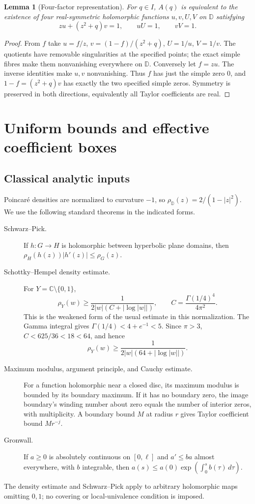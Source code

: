\documentclass[11pt,a4paper]{article}
\newtheorem{lemma}[theorem]{Lemma}
\theoremstyle{definition}\newtheorem{definition}[theorem]{Definition}
\theoremstyle{remark}\newtheorem{remark}[theorem]{Remark}
\newcommand{\D}{\mathbb D}\newcommand{\R}{\mathbb R}
\newcommand{\C}{\mathbb C}\newcommand{\Qrat}{\mathbb Q}
\begin{document}
\begin{lemma}[Four-factor representation]\label{lem:factors}
For $q\in I$, $A(q)$ is equivalent to the existence of four
real-symmetric holomorphic functions $u,v,U,V$ on $\D$ satisfying
\begin{equation}\label{eq:factors}
 zu+(z^2+q)v=1,\qquad uU=1,\qquad vV=1.
\end{equation}
\end{lemma}
\begin{proof}
From $f$ take $u=f/z$, $v=(1-f)/(z^2+q)$, $U=1/u$, $V=1/v$.
The quotients have removable singularities at the specified points;
the exact simple fibres make them nonvanishing everywhere on $\D$.
Conversely let $f=zu$. The inverse identities make $u,v$ nonvanishing.
Thus $f$ has just the simple zero $0$, and
$1-f=(z^2+q)v$ has exactly the two specified simple zeros. Symmetry is
preserved in both directions, equivalently all Taylor coefficients are real.
\end{proof}

\section{Uniform bounds and effective coefficient boxes}\label{sec:bounds}
\subsection{Classical analytic inputs}
Poincar\'e densities are normalized to curvature $-1$, so
$\rho_\D(z)=2/(1-|z|^2)$. We use the following standard theorems in
the indicated forms.
\begin{description}
\item[Schwarz--Pick.]
If $h:G\to H$ is holomorphic between hyperbolic plane domains, then
$\rho_H(h(z))|h'(z)|\leq\rho_G(z)$.
\item[Schottky--Hempel density estimate.]
For $Y=\C\setminus\{0,1\}$,
\[
 \rho_Y(w)\geq\frac1{2|w|(C+|\log|w||)},\qquad
 C=\frac{\Gamma(1/4)^4}{4\pi^2}.
\]
This is the weakened form of the usual estimate in this normalization.
The Gamma integral gives
$\Gamma(1/4)<4+e^{-1}<5$. Since $\pi>3$, $C<625/36<18<64$, and hence
\begin{equation}\label{eq:density}
 \rho_Y(w)\geq\frac1{2|w|(64+|\log|w||)}.
\end{equation}
\item[Maximum modulus, argument principle, and Cauchy estimate.]
For a function holomorphic near a closed disc, its maximum modulus is
bounded by its boundary maximum. If it has no boundary zero, the image
boundary's winding number about zero equals the number of interior zeros,
with multiplicity. A boundary bound $M$ at radius $r$ gives Taylor
coefficient bound $Mr^{-j}$.
\item[Gronwall.]
If $a\geq0$ is absolutely continuous on $[0,\ell]$ and
$a'\leq ba$ almost everywhere, with $b$ integrable, then
$a(s)\leq a(0)\exp(\int_0^s b(\tau)\,d\tau)$.
\end{description}
The density estimate and Schwarz--Pick apply to arbitrary holomorphic
maps omitting $0,1$; no covering or local-univalence condition is imposed.
\end{document}
